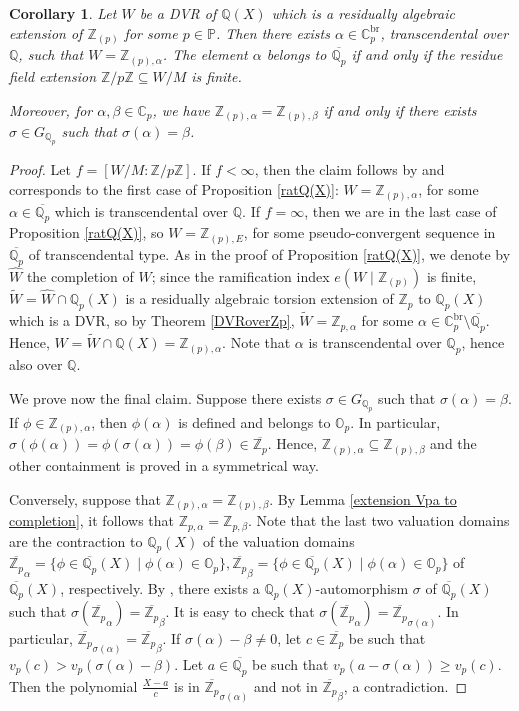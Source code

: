\documentclass[10pt]{article}
\numberwithin{equation}{section}
\newtheorem{Cor}[equation]{Corollary}
\theoremstyle{definition}\newtheorem{Def}[equation]{Definition}
\theoremstyle{definition}\newtheorem{Ques}[equation]{Question}
\newcommand{\Q}{\mathbb{Q}}
\newcommand{\Z}{\mathbb{Z}}
\renewcommand{\O}{\mathbb{O}}
\newcommand{\C}{\mathbb{C}}
\newcommand{\PP}{\mathbb{P}}
\newcommand{\oQp}{\overline{\Q_p}}
\newcommand{\wW}{\widetilde{W}}
\newcommand{\oZp}{\overline{\Z_p}}
\begin{document}
\begin{Cor}\label{DVRQ(X)rat}
Let $W$ be a DVR of $\Q(X)$ which is a residually algebraic  extension of $\Z_{(p)}$ for some $p\in\PP$. Then there exists $\alpha\in \C_p^{\text{br}}$, transcendental over $\Q$, such that $W=\Z_{(p),\alpha}$. The element $\alpha$ belongs to $\oQp$  if and only if the residue field extension $\Z/p\Z\subseteq W/M$ is finite.

Moreover, for $\alpha,\beta\in \C_p$, we have $\Z_{(p),\alpha}=\Z_{(p),\beta}$ if and only if there exists $\sigma\in G_{\Q_p}$ such that $\sigma(\alpha)=\beta$.
\end{Cor}
\begin{proof}
Let $f=[W/M:\Z/p\Z]$. If $f<\infty$, then the claim follows by \cite[Theorem 2.5]{PerTransc} and corresponds to the first case of Proposition \ref{ratQ(X)}: $W=\Z_{(p),\alpha}$, for some $\alpha\in\oQp$ which is transcendental over $\Q$. If $f=\infty$, then we are in the last case of Proposition \ref{ratQ(X)}, so $W=\Z_{(p),E}$, for some pseudo-convergent sequence in $\oQp$ of transcendental type. As in the proof of Proposition \ref{ratQ(X)}, we denote by $\widehat{W}$ the completion of $W$;  since the ramification index $e(W\mid\Z_{(p)})$ is finite, $\wW=\widehat{W}\cap\Q_p(X)$ is a residually algebraic torsion extension of $\Z_p$ to $\Q_p(X)$ which is a DVR, so by Theorem  \ref{DVRoverZp}, $\wW=\Z_{p,\alpha}$ for some $\alpha\in\C_p^{\text{br}}\setminus\oQp$. Hence, $W=\wW\cap\Q(X)=\Z_{(p),\alpha}$. Note that $\alpha$ is transcendental over $\Q_p$, hence also over $\Q$.

We prove now the final claim. Suppose there exists $\sigma\in G_{\Q_p}$ such that $\sigma(\alpha)=\beta$. If $\phi\in\Z_{(p),\alpha}$, then $\phi(\alpha)$ is defined and belongs to $\O_p$. In particular, $\sigma(\phi(\alpha))=\phi(\sigma(\alpha))=\phi(\beta)\in\oZp$. Hence, $\Z_{(p),\alpha}\subseteq\Z_{(p),\beta}$ and the other containment is proved in a symmetrical way.

Conversely, suppose that $\Z_{(p),\alpha}=\Z_{(p),\beta}$. By Lemma \ref{extension Vpa to completion}, it follows that $\Z_{p,\alpha}=\Z_{p,\beta}$. Note that the last two valuation domains are the contraction to $\Q_p(X)$ of the valuation domains $\oZp_{\alpha}=\{\phi\in\oQp(X)\mid \phi(\alpha)\in\O_p\},\oZp_{\beta}=\{\phi\in\oQp(X)\mid \phi(\alpha)\in\O_p\}$ of $\oQp(X)$, respectively. By \cite[4, Chapt. VI, §8, 6., Corollary 1]{Bourb}, there exists a $\Q_p(X)$-automorphism $\sigma$ of $\oQp(X)$ such that $\sigma(\oZp_{\alpha})=\oZp_{\beta}$. It is easy to check that $\sigma(\oZp_{\alpha})=\oZp_{\sigma(\alpha)}$. In particular, $\oZp_{\sigma(\alpha)}=\oZp_{\beta}$. If $\sigma(\alpha)-\beta\not=0$, let $c\in\oZp$ be such that $v_p(c)>v_p(\sigma(\alpha)-\beta)$. Let $a\in\oQp$ be such that $v_p(a-\sigma(\alpha))\geq v_p(c)$. Then the polynomial $\frac{X-a}{c}$ is in $\oZp_{\sigma(\alpha)}$ and not in $\oZp_{\beta}$, a contradiction.
\end{proof}
\end{document}

